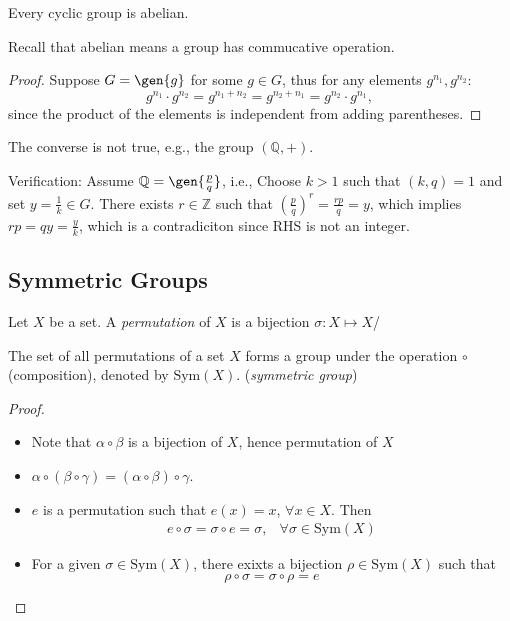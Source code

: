 \begin{proposition}
Every cyclic group is abelian.
\end{proposition}
Recall that abelian means a group has commucative operation.
\begin{proof}
Suppose $G=\gen{g}$ for some $g\in G$, thus for any elements $g^{n_1},g^{n_2}$:
\[
g^{n_1}\cdot g^{n_2}
=
g^{n_1+n_2}
=
g^{n_2+n_1}
=
g^{n_2}\cdot g^{n_1},
\]
since the product of the elements is independent from adding parentheses.
\end{proof}
\begin{remark}
The converse is not true, e.g., the group $(\mathbb{Q},+)$. 

Verification: Assume $\mathbb{Q}=\gen{\frac{p}{q}}$, i.e., 
Choose $k>1$ such that $(k,q)=1$ and set $y =\frac{1}{k}\in G$. There exists $r\in\mathbb{Z}$ such that $(\frac{p}{q})^r=\frac{rp}{q}=y$, which implies $rp=qy=\frac{y}{k}$, which is a contradiciton since RHS is not an integer.
\end{remark}

\subsection{Symmetric Groups}
\begin{definition}
Let $X$ be a set. A \emph{permutation} of $X$ is a bijection $\sigma: X\mapsto X$/
\end{definition}
\begin{proposition}
The set of all permutations of a set $X$ forms a group under the operation $\circ$ (composition), denoted by $\mbox{Sym}(X)$. (\emph{symmetric group})
\end{proposition}
\begin{proof}
\begin{itemize}
\item
Note that $\alpha\circ\beta$ is a bijection of $X$, hence permutation of $X$
\item
$\alpha\circ(\beta\circ\gamma) = (\alpha\circ\beta)\circ\gamma$.
\item
$e$ is a permutation such that $e(x) = x$, $\forall x\in X$. Then
\[
\begin{array}{ll}
e\circ\sigma = \sigma\circ e=\sigma,
&
\forall\sigma\in\mbox{Sym}(X)
\end{array}
\]
\item
For a given $\sigma\in\mbox{Sym}(X)$, there exixts a bijection $\rho\in\mbox{Sym}(X)$ such that
\[
\rho\circ\sigma=\sigma\circ\rho=e
\]
\end{itemize}
\end{proof}
